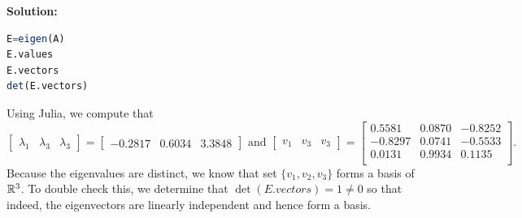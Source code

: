 \textbf{Solution:} 
\begin{lstlisting}[language=Julia,style=mystyle]
E=eigen(A)
E.values
E.vectors
det(E.vectors)
\end{lstlisting}
Using Julia, we compute that 
\begin{equation}
\left[
\begin{array}{rrr}
\lambda_1&
\lambda_3 &
\lambda_3
\end{array}
\right] =\left[
\begin{array}{rrr}
-0.2817 &
0.6034 &
3.3848 
\end{array}
\right] \text{ and } \left[
\begin{array}{rrr}
v_1&
v_3 &
v_3
\end{array}
\right] =
\left[
\begin{array}{rrr}
0.5581 & 0.0870 & -0.8252 \\
-0.8297 & 0.0741 & -0.5533 \\
0.0131 & 0.9934 & 0.1135 \\
\end{array}
\right].
\end{equation}
Because the eigenvalues are distinct, we know that set $\{v_1, v_2, v_3 \}$ forms a basis of $\mathbb R^3$. To double check this, we determine that $\det(E.vectors)=1 \neq 0$ so that indeed, the eigenvectors are linearly independent and hence form a basis. 
\Qed

\vspace*{0.2cm}

